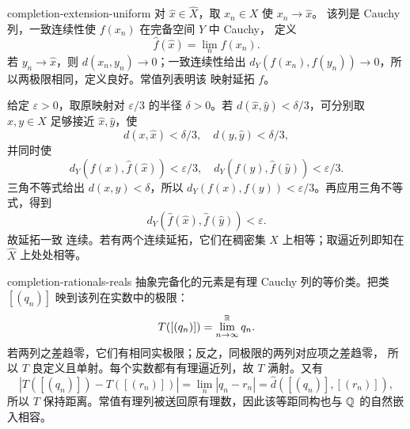 \begin{solution}{completion-extension-uniform}
对 \(\hat x\in\widehat X\)，取 \(x_n\in X\) 使 \(x_n\to\hat x\)。
该列是 Cauchy 列，一致连续性使 \(f(x_n)\) 在完备空间 \(Y\) 中 Cauchy，
定义
\[
 \widehat f(\hat x)=\lim_nf(x_n).
\]
若 \(y_n\to\hat x\)，则 \(d(x_n,y_n)\to0\)；一致连续性给出
\(d_Y(f(x_n),f(y_n))\to0\)，所以两极限相同，定义良好。常值列表明该
映射延拓 \(f\)。

给定 \(\varepsilon>0\)，取原映射对 \(\varepsilon/3\) 的半径
\(\delta>0\)。若 \(d(\hat x,\hat y)<\delta/3\)，可分别取
\(x,y\in X\) 足够接近 \(\hat x,\hat y\)，使
\[
 d(x,\hat x)<\delta/3,\quad d(y,\hat y)<\delta/3,
\]
并同时使
\[
 d_Y(f(x),\widehat f(\hat x))<\varepsilon/3,\quad
 d_Y(f(y),\widehat f(\hat y))<\varepsilon/3.
\]
三角不等式给出 \(d(x,y)<\delta\)，所以
\(d_Y(f(x),f(y))<\varepsilon/3\)。再应用三角不等式，得到
\[
 d_Y(\widehat f(\hat x),\widehat f(\hat y))<\varepsilon.
\]
故延拓一致
连续。若有两个连续延拓，它们在稠密集 \(X\) 上相等；取逼近列即知在
\(\widehat X\) 上处处相等。
\end{solution}

\begin{solution}{completion-rationals-reals}
抽象完备化的元素是有理 Cauchy 列的等价类。把类
\([(q_n)]\) 映到该列在实数中的极限：
\[
 T([(q_n)])=\lim_{n\to\infty}^{\mathbb{R}}q_n.
\]
若两列之差趋零，它们有相同实极限；反之，同极限的两列对应项之差趋零，
所以 \(T\) 良定义且单射。每个实数都有有理逼近列，故 \(T\) 满射。又有
\[
 |T([(q_n)])-T([(r_n)])|
 =\lim_n|q_n-r_n|
 =\widehat d([(q_n)],[(r_n)]),
\]
所以 \(T\) 保持距离。常值有理列被送回原有理数，因此该等距同构也与
\(\mathbb{Q}\) 的自然嵌入相容。
\end{solution}

